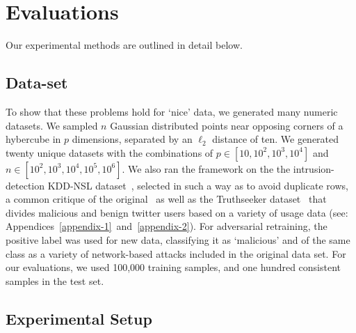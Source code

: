 \documentclass[fonts]{icst}
\begin{document}
\section{Evaluations}
Our experimental methods are outlined in detail below.
\subsection{Data-set}
To show that these problems hold for `nice' data, we generated many numeric datasets.
We sampled $n$ Gaussian distributed points near opposing corners of a hybercube in $p$ dimensions, separated by an $\ell_2$ distance of ten.
We generated twenty unique datasets with the combinations of $p \in [10, 10^{2}, 10^{3}, 10^{4}]$ and $n \in [10^2, 10^3, 10^4, 10^5, 10^6]$.
We also ran the framework on the the intrusion-detection KDD-NSL dataset~\cite{kdd-nsl}, selected in such a way as to avoid duplicate rows, a common critique of the original~\cite{Dua:2019} as well as the Truthseeker dataset~\cite{truthseeker} that divides malicious and benign twitter users based on a variety of usage data (see: Appendices~\ref{appendix-1}~and~\ref{appendix-2}).
For adversarial retraining, the positive label was used for new data, classifying it as `malicious' and of the same class as a variety of network-based attacks included in the original data set.
For our evaluations, we used 100,000 training samples, and one hundred consistent samples in the test set.




\subsection{Experimental Setup}
\end{document}
